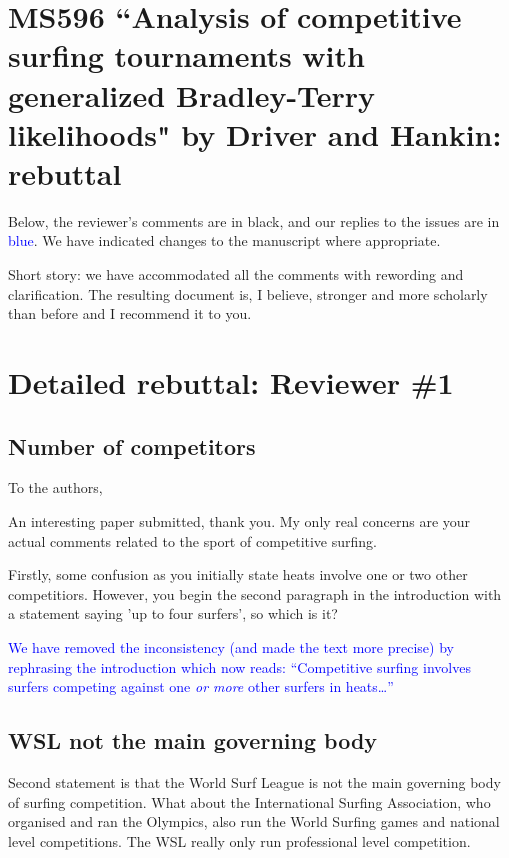\documentclass[12pt]{article}
\begin{document}
\section*{MS596 ``Analysis of competitive surfing tournaments with generalized Bradley-Terry likelihoods" by Driver and Hankin: rebuttal}

Below, the reviewer's comments are in black, and our replies to the
issues are in \textcolor{blue}{blue}.  We have indicated changes to
the manuscript where appropriate.

Short story: we have accommodated all the comments with rewording and
clarification.  The resulting document is, I believe, stronger and
more scholarly than before and I recommend it to you.

\section*{Detailed rebuttal: Reviewer \#1}



\subsection*{Number of competitors}

To the authors,

An interesting paper submitted, thank you. My only
real concerns are your actual comments related to the sport of
competitive surfing.

Firstly, some confusion as you initially state heats involve one or
two other competitiors. However, you begin the second paragraph in the
introduction with a statement saying 'up to four surfers', so which is
it?

\textcolor{blue}{We have removed the inconsistency (and made the text
  more precise) by rephrasing the introduction which now reads:
  ``Competitive surfing involves surfers competing against one {\em or
    more} other surfers in heats\ldots''}

\subsection*{WSL not the main governing body}

Second statement is that the World Surf League is not the main
governing body of surfing competition. What about the International
Surfing Association, who organised and ran the Olympics, also run the
World Surfing games and national level competitions. The WSL really
only run professional level competition.
\end{document}
